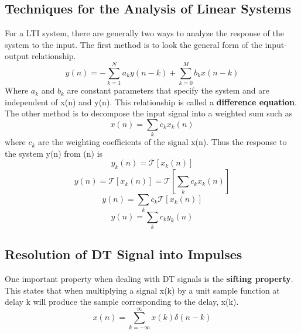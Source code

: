 \documentclass{article} %
\begin{document}
	\subsection{Techniques for the Analysis of Linear Systems}
	For a LTI system, there are generally two ways to analyze the response of the system to the input. The first method is to look the general form of the input-output relationship.
	\begin{equation}
 	y(n) = - \sum_{k=1}^N a_ky(n-k) + \sum_{k=0}^M b_k x(n-k)
	\end{equation}
	Where $a_k$ and $b_k$ are constant parameters that specify the system and are independent of x(n) and y(n). This relationship is called a \textbf{difference equation}. The other method is to decompose the input signal into a weighted sum such as
	\begin{equation}
	x(n) = \sum_k c_k x_k(n)
	\end{equation}
	where $c_k$ are the weighting coefficients of the signal x(n). Thus the response to the system y(n) from (n) is
	\begin{equation}
 	y_k(n) = \mathcal{T}[x_k(n)]
	\end{equation}
	\begin{equation}
 	y(n) = \mathcal{T}[x_k(n)] = \mathcal{T}[\sum_kc_kx_k(n)]
	\end{equation}
	\begin{equation}
 	y(n) = \sum_kc_k \mathcal{T}[x_k(n)]
	\end{equation}
	\begin{equation}
 	y(n) = \sum_kc_ky_k(n)
	\end{equation}
	
	\subsection{Resolution of DT Signal into Impulses}
	One important property when dealing with DT signals is the \textbf{sifting property}. This states that when multiplying a signal x(k) by a unit sample function at delay k will produce the sample corresponding to the delay, x(k).
	\begin{equation}
 	x(n) = \sum_{k=-\infty}^{\infty} x(k) \delta(n-k)
	\end{equation}
	
\end{document}
